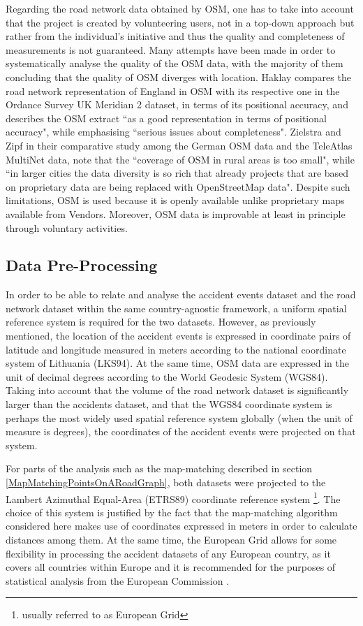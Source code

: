 \documentclass[12pt]{article}
\theoremstyle{definition}
\begin{document}
Regarding the road network data obtained by OSM, one has to take into account that the project is created by volunteering users, not in a top-down approach but rather from the individual's initiative and thus the quality and completeness of measurements is not guaranteed. Many attempts have been made in order to systematically analyse the quality of the OSM data, with the majority of them concluding that the quality of OSM diverges with location. Haklay \cite{HAKLAY} compares the road network representation of England in OSM with its respective one in the Ordance Survey UK Meridian 2 dataset, in terms of its positional accuracy, and describes the OSM extract ``as a good representation in terms of positional accuracy", while emphasising ``serious issues about completeness". Zielstra and Zipf \cite{zielstra} in their comparative study among the German OSM data and the TeleAtlas MultiNet data, note that the ``coverage of OSM in rural areas is too small", while ``in larger cities the data diversity is so rich that already projects that are based on proprietary data are being replaced with OpenStreetMap data". Despite such limitations, OSM is used because it is openly available unlike proprietary maps available from Vendors. Moreover, OSM data is improvable at least in principle through voluntary activities.  

\subsection{Data Pre-Processing}\label{DataPreProcessing}
In order to be able to relate and analyse the accident events dataset and the road network dataset within the same country-agnostic framework, a uniform spatial reference system is required for the two datasets. However, as previously mentioned, the location of the accident events is expressed in coordinate pairs of latitude and longitude measured in meters according to the national coordinate system of Lithuania (LKS94). At the same time, OSM data are expressed in the unit of decimal degrees according to the World Geodesic System (WGS84). Taking into account that the volume of the road network dataset is significantly larger than the accidents dataset, and that the WGS84 coordinate system is perhaps the most widely used spatial reference system globally (when the unit of measure is degrees), the coordinates of the accident events were projected on that system. 

For parts of the analysis such as the map-matching described in section \ref{MapMatchingPointsOnARoadGraph}, both datasets were projected to the Lambert Azimuthal Equal-Area (ETRS89) coordinate reference system \footnote{usually referred to as European Grid}. The choice of this system is justified by the fact that the map-matching algorithm considered here makes use of coordinates expressed in meters in order to calculate distances among them. At the same time, the European Grid allows for some flexibility in processing the accident datasets of any European country, as it covers all countries within Europe and it is recommended for the purposes of statistical analysis from the European Commission \cite{3035}.
\end{document}
